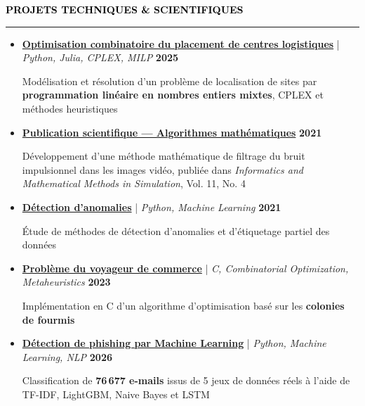 \documentclass[10pt,english,french]{article}
\newcommand{\itProjectIcon}[1][black]{\textcolor{#1}{\faLaptopCode}}
\newcommand{\cvsection}[1]{
    \vspace{4pt}
    \textbf{\fontsize{9pt}{10pt}\selectfont \textcolor{black}{#1}}
    \vspace{6pt}
    \hrule
    \vspace{6pt}
}
\begin{document}
\vspace{-4pt}
\vspace{-4pt}
\cvsection{\itProjectIcon[black]\hspace{4pt}PROJETS TECHNIQUES \& SCIENTIFIQUES}

\vspace{-7pt}
\begin{itemize}[leftmargin=0.5cm, label=\textbullet, itemsep=0.12em]
    \item \href{https://github.com/DmytroPalahin/logistics-center-placement}
          {\textbf{Optimisation combinatoire du placement de centres logistiques}} |
          \textit{Python, Julia, CPLEX, MILP} \hfill \textbf{2025}

          Modélisation et résolution d'un problème de localisation de sites par
          \textbf{programmation linéaire en nombres entiers mixtes}, CPLEX et méthodes heuristiques

    \item \href{https://www.researchsquare.com/article/rs-2203260/v1}
          {\textbf{Publication scientifique --- Algorithmes mathématiques}} \hfill \textbf{2021}

          Développement d'une méthode mathématique de filtrage du bruit impulsionnel dans les images vidéo,
          publiée dans \textit{Informatics and Mathematical Methods in Simulation}, Vol. 11, No. 4

    \item \href{https://github.com/DmytroPalahin/Anomaly_Detection}
          {\textbf{Détection d'anomalies}} | \textit{Python, Machine Learning} \hfill \textbf{2021}

          Étude de méthodes de détection d'anomalies et d'étiquetage partiel des données

    \item \href{https://github.com/DmytroPalahin/Probleme_du_Voyageur_de_Commerce}
          {\textbf{Problème du voyageur de commerce}} |
          \textit{C, Combinatorial Optimization, Metaheuristics} \hfill \textbf{2023}

          Implémentation en C d'un algorithme d'optimisation basé sur les \textbf{colonies de fourmis}

    \item \href{https://github.com/DmytroPalahin/phishing-email-detection}
          {\textbf{Détection de phishing par Machine Learning}} |
          \textit{Python, Machine Learning, NLP} \hfill \textbf{2026}

          Classification de \textbf{76\,677 e-mails} issus de 5 jeux de données réels à l'aide de
          TF-IDF, LightGBM, Naive Bayes et LSTM
\end{itemize}
\end{document}
